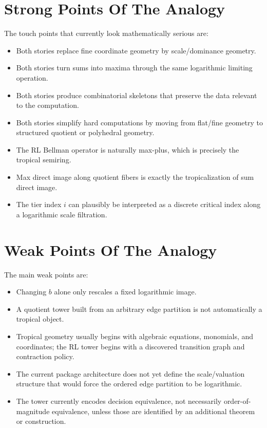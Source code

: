 \documentclass[11pt]{article}
\begin{document}
\section{Strong Points Of The Analogy}

The touch points that currently look mathematically serious are:

\begin{itemize}[leftmargin=2em]
\item Both stories replace fine coordinate geometry by scale/dominance
geometry.
\item Both stories turn sums into maxima through the same logarithmic limiting
operation.
\item Both stories produce combinatorial skeletons that preserve the data
relevant to the computation.
\item Both stories simplify hard computations by moving from flat/fine geometry
to structured quotient or polyhedral geometry.
\item The RL Bellman operator is naturally max-plus, which is precisely the
tropical semiring.
\item Max direct image along quotient fibers is exactly the tropicalization of
sum direct image.
\item The tier index \(i\) can plausibly be interpreted as a discrete critical
index along a logarithmic scale filtration.
\end{itemize}

\section{Weak Points Of The Analogy}

The main weak points are:

\begin{itemize}[leftmargin=2em]
\item Changing \(b\) alone only rescales a fixed logarithmic image.
\item A quotient tower built from an arbitrary edge partition is not
automatically a tropical object.
\item Tropical geometry usually begins with algebraic equations, monomials, and
coordinates; the RL tower begins with a discovered transition graph and
contraction policy.
\item The current package architecture does not yet define the scale/valuation
structure that would force the ordered edge partition to be logarithmic.
\item The tower currently encodes decision equivalence, not necessarily
order-of-magnitude equivalence, unless those are identified by an additional
theorem or construction.
\end{itemize}
\end{document}
